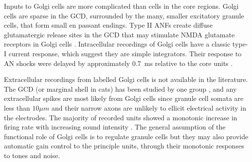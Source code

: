 


Inputs to Golgi cells are more complicated than \VCN cells in the core
regions. Golgi cells are sparse in the GCD, surrounded by the many, smaller
excitatory granule cells, that form small en passant endings. Type II ANFs
create diffuse glutamatergic release sites in the GCD
\citep{HurdHutsonEtAl:1999,BensonBrown:2004} that may stimulate NMDA glutamate
receptors in Golgi cells \citep{FerragamoGoldingEtAl:1998a}.  Intracellular
recordings of Golgi cells have a classic type-I current response, which suggest
they are simple integrators. Their response to AN shocks were delayed by
approximately 0.7~ms relative to the core \VCN units
\citep{FerragamoGoldingEtAl:1998}.


Extracellular recordings from labelled Golgi cells is not available in the
literature.  The GCD (or marginal shell in cats) has been studied by one group
\citet{GhoshalKim:1997}, and any extracellular spikes are most likely from Golgi
cells since granule cell somata are less than $10{}\mu{m}$ and their narrow
axons are unlikely to ellicit electrical activity in the electrodes. The
majority of recorded units showed a monotonic increase in firing rate with
increasing sound intensity
\citep[Figure~\ref{fig:GolgiKimFig2}][]{GhoshalKim:1997}.  The general
assumption of the functional role of Golgi cells is to regulate granule cells
but they may also provide automatic gain control to the principle \VCN units,
through their monotonic responses to tones and noise.

